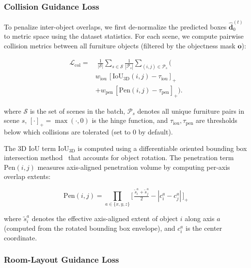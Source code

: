 \subsubsection{Collision Guidance Loss}
\label{sec:method:collision_loss}

To penalize inter-object overlaps, we first de-normalize the predicted boxes $\hat{\mathbf{d}}_0^{(t)}$ to metric space using the dataset statistics.
For each scene, we compute pairwise collision metrics between all furniture objects (filtered by the objectness mask $\mathbf{o}$):

\begin{equation}
\begin{aligned}
\mathcal{L}_{\mathrm{col}}
=&\;
\frac{1}{|\mathcal{S}|}
\sum_{s \in \mathcal{S}}
\frac{1}{|\mathcal{P}_s|}
\sum_{(i,j)\in\mathcal{P}_s}
\Big(
\\
&
w_{\mathrm{iou}}
\,[\mathrm{IoU}_{3\mathrm{D}}(i,j)-\tau_{\mathrm{iou}}]_+
\\
&+
w_{\mathrm{pen}}
\,[\mathrm{Pen}(i,j)-\tau_{\mathrm{pen}}]_+
\Big).
\end{aligned}
\label{eq:collision_loss}
\end{equation}

\noindent where $\mathcal{S}$ is the set of scenes in the batch, $\mathcal{P}_s$ denotes all unique furniture pairs in scene $s$, $[\cdot]_+ = \max(\cdot, 0)$ is the hinge function, and $\tau_{\mathrm{iou}}, \tau_{\mathrm{pen}}$ are thresholds below which collisions are tolerated (set to $0$ by default).

The 3D IoU term $\text{IoU}_{3\mathrm{D}}$ is computed using a differentiable oriented bounding box intersection method~\cite{zhou2019iou} that accounts for object rotation.
The penetration term $\text{Pen}(i,j)$ measures axis-aligned penetration volume by computing per-axis overlap extents:

\begin{equation}
\text{Pen}(i,j) = \prod_{a \in \{x,y,z\}} \Big[\,
    \tfrac{\tilde{s}_i^a + \tilde{s}_j^a}{2} - |c_i^a - c_j^a|
\,\Big]_+
\label{eq:penetration}
\end{equation}

\noindent where $\tilde{s}_i^a$ denotes the effective axis-aligned extent of object $i$ along axis $a$ (computed from the rotated bounding box envelope), and $c_i^a$ is the center coordinate.

\subsubsection{Room-Layout Guidance Loss}
\label{sec:method:room_loss}

